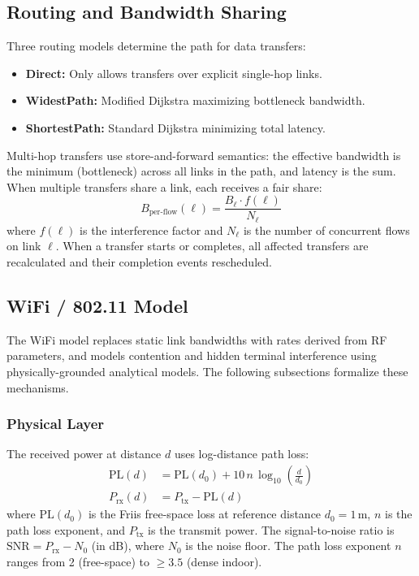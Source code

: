 \documentclass[conference]{IEEEtran}
\begin{document}
\subsection{Routing and Bandwidth Sharing}

Three routing models determine the path for data transfers:

\begin{itemize}[itemsep=1pt,leftmargin=*]
\item \textbf{Direct:} Only allows transfers over explicit single-hop links.
\item \textbf{WidestPath:} Modified Dijkstra maximizing bottleneck bandwidth.
\item \textbf{ShortestPath:} Standard Dijkstra minimizing total latency.
\end{itemize}

Multi-hop transfers use store-and-forward semantics: the effective bandwidth
is the minimum (bottleneck) across all links in the path, and latency is the
sum.  When multiple transfers share a link, each receives a fair share:
\begin{equation}
B_\text{per-flow}(\ell) = \frac{B_\ell \cdot f(\ell)}{N_\ell}
\label{eq:fair_share}
\end{equation}
where $f(\ell)$ is the interference factor and $N_\ell$ is the number of
concurrent flows on link $\ell$.  When a transfer starts or completes, all
affected transfers are recalculated and their completion events rescheduled.

\subsection{WiFi / 802.11 Model}
\label{sec:wifi}

The WiFi model replaces static link bandwidths with rates derived from RF
parameters, and models contention and hidden terminal interference using
physically-grounded analytical models.  The following subsections formalize
these mechanisms.

\subsubsection{Physical Layer}

The received power at distance $d$ uses log-distance path loss:
\begin{align}
\text{PL}(d) &= \text{PL}(d_0) + 10\,n\,\log_{10}\!\left(\frac{d}{d_0}\right) \label{eq:pathloss} \\
P_\text{rx}(d) &= P_\text{tx} - \text{PL}(d) \label{eq:rxpower}
\end{align}
where $\text{PL}(d_0)$ is the Friis free-space loss at reference distance
$d_0 = 1$\,m, $n$ is the path loss exponent, and $P_\text{tx}$ is the
transmit power.  The signal-to-noise ratio is $\text{SNR} = P_\text{rx} - N_0$
(in dB), where $N_0$ is the noise floor.  The path loss exponent $n$ ranges from 2 (free-space) to $\geq 3.5$
(dense indoor).
\end{document}
